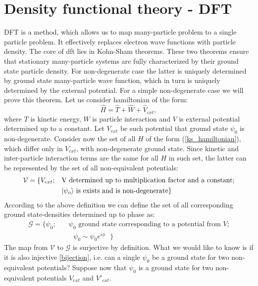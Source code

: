 \documentclass[openany, longbibliography,slovene,a4paper,12pt]{article}
\begin{document}
\section{Density functional theory - DFT}
DFT is a method, which allows us to map many-particle problem to a
single particle problem. It effectively replaces electron wave functions with
particle density.  The core of dft lies in Kohn-Sham theorems. These two theorems
ensure that stationary many-particle systems are fully characterized by their
ground state particle density. For non-degenerate case the latter is uniquely determined
by ground state many-particle wave function, which in turn is uniquely determined by the
external potential. For a simple non-degenerate case we will prove this theorem. Let us consider hamiltonian of the form:
\begin{equation} \label{ks_hamiltonian}
\hat H = \hat T + \hat W + \hat V_{ext},
\end{equation}
where $T$ is kinetic energy, $W$ is particle interaction and $V$ is external
potential determined up to a constant. Let $V_{ext}$ be such potential that
ground state $\psi_0$ is non-degenerate. Consider now the set of all $H$ of the
form (\ref{ks_hamiltonian}), which
differ only in $V_{ext}$, with non-degenerate ground state. Since kinetic and
inter-particle interaction terms are the same for all $H$ in such set, the latter
can be represented by the set of all non-equivalent potentials:
\begin{equation}
  \begin{split}
    \mathcal{V} = \{V_{ext};\quad &\textrm{V determined up to multiplication factor and a constant;}\\
    & \textrm{$\ket{\psi_o}$ is exists and is non-degenerate}\}
    \end{split}
 \end{equation}
According to the above definition we can define the set of all corresponding
ground state-densities determined up to phase as:
\begin{equation}
  \begin{split}
    \mathcal{G} = \{\psi_0; \quad &\textrm{$\psi_0$ ground state corresponding to a potential from $V$;}\\
&\textrm{ $\psi_0\sim\psi_0e^{i\phi}$   }
    \}
    \end{split}
  \end{equation}
The map from $\mathcal{V}$ to $\mathcal{G}$ is surjective by definition. What we
would like to know is if it is also injective  \ref{bijection}, i.e. can a single $\psi_0$ be a
ground state for two non-equivalent potentials? Suppose now that $\psi_0$ is a
ground state for two non-equivalent potentials $V_{ext}$ and $V'_{ext}$.
\end{document}
